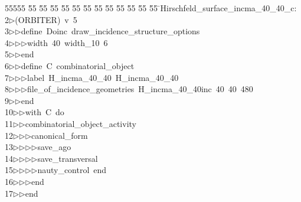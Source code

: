%
%
\begin{tabbing}
55555 \= 55 \= 55 \= 55 \= 55 \= 55 \= 55 \= 55 \= 55 \= 55 \= 55 \= 55 \= 55 \= \>Hirschfeld\_surface\_incma\_40\_40\_c:\\[0pt]
2\>$\triangleright$\>(ORBITER)\ v\ 5\ \\[0pt]
3\>$\triangleright$\>$\triangleright$\>define\ Doinc\ draw\_incidence\_structure\_options\ \\[0pt]
4\>$\triangleright$\>$\triangleright$\>$\triangleright$\>width\ 40\ width\_10\ 6\ \\[0pt]
5\>$\triangleright$\>$\triangleright$\>end\ \\[0pt]
6\>$\triangleright$\>$\triangleright$\>define\ C\ combinatorial\_object\ \\[0pt]
7\>$\triangleright$\>$\triangleright$\>$\triangleright$\>label\ H\_incma\_40\_40\ H\_incma\_40\_40\ \\[0pt]
8\>$\triangleright$\>$\triangleright$\>$\triangleright$\>file\_of\_incidence\_geometries\ H\_incma\_40\_40inc\ 40\ 40\ 480\ \\[0pt]
9\>$\triangleright$\>$\triangleright$\>end\ \\[0pt]
10\>$\triangleright$\>$\triangleright$\>with\ C\ do\ \\[0pt]
11\>$\triangleright$\>$\triangleright$\>combinatorial\_object\_activity\ \\[0pt]
12\>$\triangleright$\>$\triangleright$\>$\triangleright$\>canonical\_form\ \\[0pt]
13\>$\triangleright$\>$\triangleright$\>$\triangleright$\>$\triangleright$\>save\_ago\ \\[0pt]
14\>$\triangleright$\>$\triangleright$\>$\triangleright$\>$\triangleright$\>save\_transversal\ \\[0pt]
15\>$\triangleright$\>$\triangleright$\>$\triangleright$\>$\triangleright$\>nauty\_control\ end\ \\[0pt]
16\>$\triangleright$\>$\triangleright$\>$\triangleright$\>end\ \\[0pt]
17\>$\triangleright$\>$\triangleright$\>end\ \\[0pt]

\end{tabbing}
